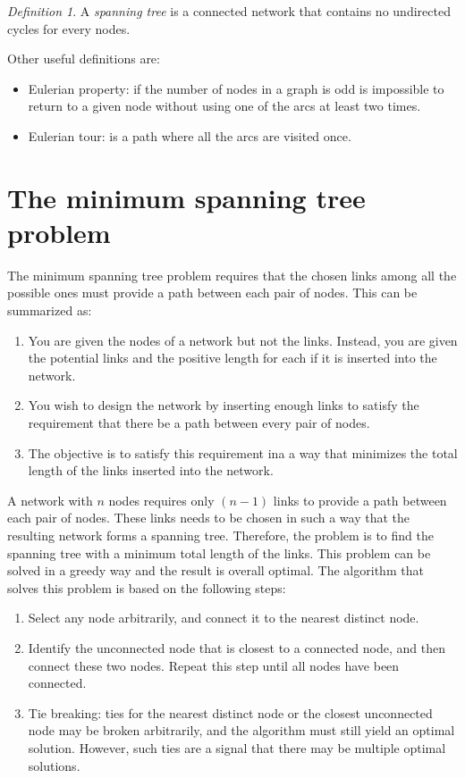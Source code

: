\documentclass[12pt, a4paper]{report}
\theoremstyle{remark}
\newtheorem*{remark}{Definition}
\begin{document}
\begin{remark}
    A \emph{spanning tree} is a connected network that contains no undirected cycles for every nodes.
\end{remark}
Other useful definitions are: 
\begin{itemize}
    \item Eulerian property: if the number of nodes in a graph is odd is impossible to return to a given node without using one of the 
    arcs at least two times. 
    \item Eulerian tour: is a path where all the arcs are visited once.
\end{itemize}
\section{The minimum spanning tree problem}
The minimum spanning tree problem requires that the chosen links among all the possible ones must provide a path between each pair of nodes.
This can be summarized as: 
\begin{enumerate}
    \item You are given the nodes of a network but not the links. Instead, you are given the potential links and the positive length
    for each if it is inserted into the network. 
    \item You wish to design the network by inserting enough links to satisfy the requirement that there be a path between every pair of nodes.
    \item The objective is to satisfy this requirement ina a way that minimizes the total length of the links inserted into the network. 
\end{enumerate}
A network with $n$ nodes requires only $(n-1)$ links to provide a path between each pair of nodes. These links needs to be chosen in such 
a way that the resulting network forms a spanning tree. Therefore, the problem is to find the spanning tree with a minimum total length of
the links. This problem can be solved in a greedy way and the result is overall optimal. The algorithm that solves this problem is based on
the following steps: 
\begin{enumerate}
    \item Select any node arbitrarily, and connect it to the nearest distinct node. 
    \item Identify the unconnected node that is closest to a connected node, and then connect these two nodes. Repeat this step until all
    nodes have been connected.
    \item Tie breaking: ties for the nearest distinct node or the closest unconnected node may be broken arbitrarily, and the algorithm
    must still yield an optimal solution. However, such ties are a signal that there may be multiple optimal solutions.
\end{enumerate}
\end{document}
